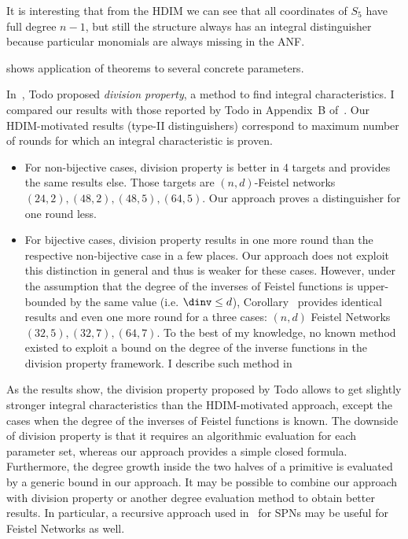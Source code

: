 It is interesting that from the HDIM we can see that all coordinates of $S_5$ have full degree $n-1$, but still the structure always has an integral distinguisher because particular monomials are always missing in the ANF.


 shows application of theorems to several concrete parameters.

In~\cite{division}, Todo proposed \emph{division property}, a method to find integral characteristics. I compared our results with those reported by Todo in Appendix~B of~\cite{division}. Our HDIM-motivated results (type-II distinguishers) correspond to maximum number of rounds for which an integral characteristic is proven.
\begin{itemize}
    \item For non-bijective cases, division property is better in 4 targets and provides the same results else. Those targets are $(n,d)$-Feistel networks $(24, 2),(48, 2),(48, 5),(64, 5)$. Our approach proves a distinguisher for one round less.
    
    \item For bijective cases, division property results in one more round than the respective non-bijective case in a few places. Our approach does not exploit this distinction in general and thus is weaker for these cases. However, under the assumption that the degree of the inverses of Feistel functions is upper-bounded by the same value (i.e. $\dinv \le d$), Corollary~ provides identical results and even one more round for a three cases: $(n,d)$ Feistel Networks $(32,5),(32,7),(64,7)$.
    To the best of my knowledge, no known method existed to exploit a bound on the degree of the inverse functions in the division property framework. I describe such method in 
\end{itemize}

As the results show, the division property proposed by Todo allows to get slightly stronger integral characteristics than the HDIM-motivated approach, except the cases when the degree of the inverses of Feistel functions is known. The downside of division property is that it requires an algorithmic evaluation for each parameter set, whereas our approach provides a simple closed formula.
Furthermore, the degree growth inside the two halves of a primitive is evaluated by a generic bound in our approach. It may be possible to combine our approach with division property or another degree evaluation method to obtain better results. In particular, a recursive approach used in~\cite{LeoSPN} for SPNs may be useful for Feistel Networks as well.


